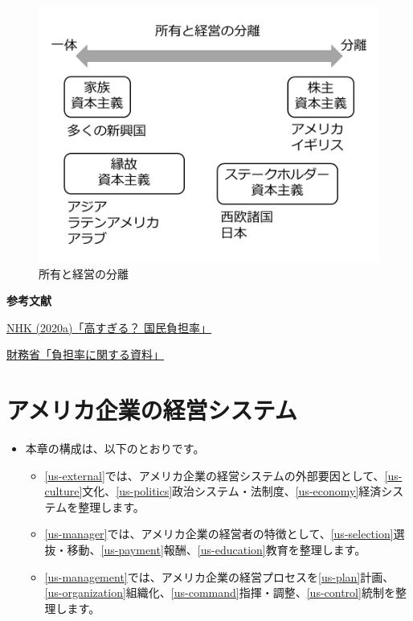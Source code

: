 \documentclass[
]{book}
\begin{document}
\begin{figure}
\includegraphics[width=960px]{separation} \caption{所有と経営の分離}\label{fig:separation}
\end{figure}

{\textbf{参考文献}}

\href{https://www3.nhk.or.jp/news/special/sakusakukeizai/articles/20200302.html}{NHK (2020a)「高すぎる？ 国民負担率」}

\href{https://www.mof.go.jp/tax_policy/summary/condition/a04.htm}{財務省「負担率に関する資料」}

\hypertarget{usa}{%
\chapter{アメリカ企業の経営システム}\label{usa}}

\begin{itemize}
\item
  本章の構成は、以下のとおりです。

  \begin{itemize}
  \item
    \ref{us-external}では、アメリカ企業の経営システムの外部要因として、\ref{us-culture}文化、\ref{us-politics}政治システム・法制度、\ref{us-economy}経済システムを整理します。
  \item
    \ref{us-manager}では、アメリカ企業の経営者の特徴として、\ref{us-selection}選抜・移動、\ref{us-payment}報酬、\ref{us-education}教育を整理します。
  \item
    \ref{us-management}では、アメリカ企業の経営プロセスを\ref{us-plan}計画、\ref{us-organization}組織化、\ref{us-command}指揮・調整、\ref{us-control}統制を整理します。
  \end{itemize}
\end{itemize}
\end{document}
